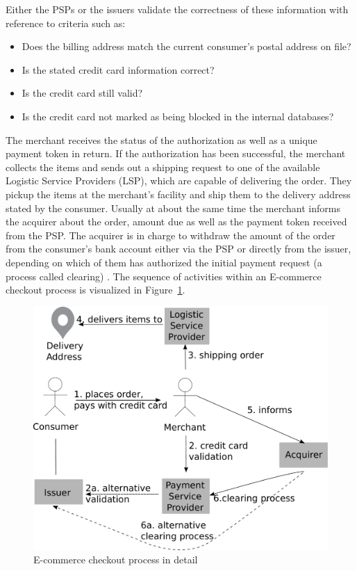 Either the \gls{PSP}s or the issuers validate the correctness of these information with reference to criteria such as: \@

\begin{itemize}
    \item Does the billing address match the current consumer's postal address on file?
    \item Is the stated credit card information correct?
    \item Is the credit card still valid?
    \item Is the credit card not marked as being blocked in the internal databases?
\end{itemize}

The merchant receives the status of the authorization as well as a unique payment token in return. If the authorization has been successful, the merchant collects the items and sends out a shipping request to one of the available Logistic Service Providers (\gls{LSP}), which are capable of delivering the order. They pickup the items at the merchant's facility and ship them to the delivery address stated by the consumer. Usually at about the same time the merchant informs the acquirer about the order, amount due as well as the payment token received from the \gls{PSP}. The acquirer is in charge to withdraw the amount of the order from the consumer's bank account either via the \gls{PSP} or directly from the issuer, depending on which of them has authorized the initial payment request (a process called clearing) \citep{VisaPayment2014}. The sequence of activities within an \gls{E-commerce} checkout process is visualized in Figure~\ref{fig:images_ecommerce_checkout_process}.\@

\begin{figure}[!ht]
	\centering
		\includegraphics[width=0.9\columnwidth]{images/e-commerce-checkout-process.pdf}
	\caption{\Gls{E-commerce} checkout process in detail}
\label{fig:images_ecommerce_checkout_process}
\end{figure}

